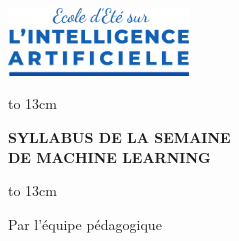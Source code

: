 \documentclass[12pt,a4paper]{article}
\begin{document}
{\begin{titlepage}
\begin{center}
        {\sc \includegraphics[width=0.36\textwidth, height=0.14\textwidth]{../figures/LOGO EEIA.png}}\\[1em]
        {\sc {}}
    
        \vspace{1.2cm}
    \centerline{\hbox to 13cm{\hrulefill}}
    \vspace{0.3cm}
    { \Large  \uppercase{\textbf{{Syllabus de la semaine\\ de Machine Learning }}}}
    \vspace{0.3cm}
    \centerline{\hbox to 13cm{\hrulefill}}
    
    \vspace{1.2cm}
    {\sc \Large {Par l'équipe pédagogique}\\ [1.5 cm]
    }
    \vspace{1.7cm}
    

\end{center}
\end{titlepage}}
\end{document}
